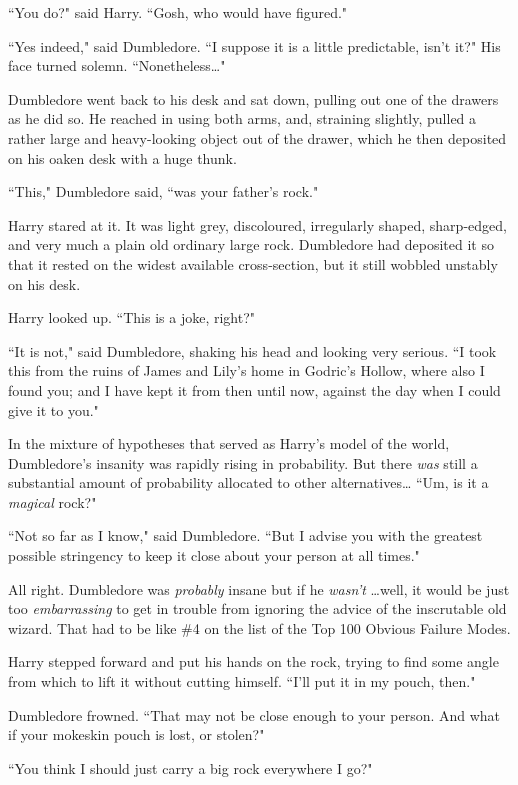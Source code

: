 ``You do?" said Harry. ``Gosh, who would have figured."

``Yes indeed," said Dumbledore. ``I suppose it is a little predictable, isn't it?" His face turned solemn. ``Nonetheless{\ldots}"

Dumbledore went back to his desk and sat down, pulling out one of the drawers as he did so. He reached in using both arms, and, straining slightly, pulled a rather large and heavy-looking object out of the drawer, which he then deposited on his oaken desk with a huge thunk.

``This," Dumbledore said, ``was your father's rock."

Harry stared at it. It was light grey, discoloured, irregularly shaped, sharp-edged, and very much a plain old ordinary large rock. Dumbledore had deposited it so that it rested on the widest available cross-section, but it still wobbled unstably on his desk.

Harry looked up. ``This is a joke, right?"

``It is not," said Dumbledore, shaking his head and looking very serious. ``I took this from the ruins of James and Lily's home in Godric's Hollow, where also I found you; and I have kept it from then until now, against the day when I could give it to you."

In the mixture of hypotheses that served as Harry's model of the world, Dumbledore's insanity was rapidly rising in probability. But there \emph{was} still a substantial amount of probability allocated to other alternatives{\ldots} ``Um, is it a \emph{magical} rock?"

``Not so far as I know," said Dumbledore. ``But I advise you with the greatest possible stringency to keep it close about your person at all times."

All right. Dumbledore was \emph{probably} insane but if he \emph{wasn't} {\ldots}well, it would be just too \emph{embarrassing} to get in trouble from ignoring the advice of the inscrutable old wizard. That had to be like \#4 on the list of the Top 100 Obvious Failure Modes.

Harry stepped forward and put his hands on the rock, trying to find some angle from which to lift it without cutting himself. ``I'll put it in my pouch, then."

Dumbledore frowned. ``That may not be close enough to your person. And what if your mokeskin pouch is lost, or stolen?"

``You think I should just carry a big rock everywhere I go?"

